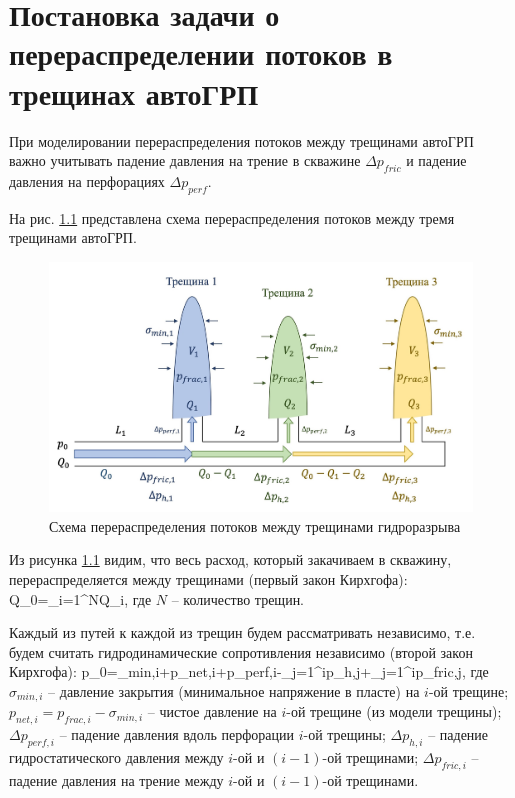 \chapter{Постановка задачи о перераспределении потоков в трещинах автоГРП} \label{ch1}

При моделировании перераспределения потоков между трещинами автоГРП важно учитывать падение давления на трение в скважине $\Delta p_{fric}$ и падение давления на перфорациях $\Delta p_{per\!f}$.

На рис. \ref{fig:flow_distribution_scheme} представлена схема перераспределения потоков между тремя трещинами автоГРП.

\begin{figure}[H] 
\center
\includegraphics[width=0.9\linewidth]{images/flow_distribution_scheme.jpg}
\caption{Схема перераспределения потоков между трещинами гидроразрыва} 
\label{fig:flow_distribution_scheme}  
\end{figure}

Из рисунка \ref{fig:flow_distribution_scheme} видим, что весь расход, который закачиваем в скважину, перераспределяется между трещинами (первый закон Кирхгофа):
\beq\label{1_1}
Q_0=\sum\limits_{i=1}^{N}Q_i,
\eeq
где $N$ -- количество трещин.

Каждый из путей к каждой из трещин будем рассматривать независимо, т.е. будем считать гидродинамические сопротивления независимо (второй закон Кирхгофа):
\beq\label{1_2}
p_0=\sigma_{min,i}+p_{net,i}+\Delta p_{perf,i}-\sum_{j=1}^{i}{\Delta p_{h,j}}+\sum_{j=1}^{i}\Delta p_{fric,j},
\eeq
где $\sigma_{min,i}$ -- давление закрытия (минимальное напряжение в пласте) на $i$-ой трещине;\newline
$p_{net,i}=p_{frac,i}-\sigma_{min,i}$ -- чистое давление на $i$-ой трещине (из модели трещины);\newline
$\Delta p_{perf,i}$ -- падение давления вдоль перфорации $i$-ой трещины;\newline
$\Delta p_{h,i}$ -- падение гидростатического давления между $i$-ой и $(i-1)$-ой трещинами;\newline
$\Delta p_{fric,i}$ -- падение давления на трение между $i$-ой и $(i-1)$-ой трещинами.

